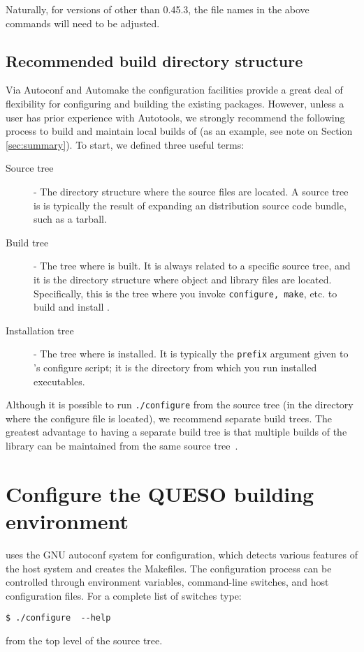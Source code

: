 Naturally, for versions of \Queso{} other than 0.45.3, the file names in the above commands will need to be adjusted.


\subsection{Recommended build directory structure}\label{sec:Queso_tree}

Via Autoconf and Automake the \Queso{} configuration facilities provide a great deal 
of flexibility for configuring and building the existing \Queso{} packages. However,
unless a user has prior experience with Autotools, we strongly recommend
the following process to build and maintain local builds of \Queso{} (as an example, see note on Section \ref{sec:summary}).
To start, we defined three useful terms:

\begin{description}
 \item [Source tree] - The directory structure where the \Queso{} source files are located. A source
tree is is typically the result of expanding an \Queso{} distribution source code bundle, such as a tarball.%
 \item [Build tree] %
- The tree where \Queso{} is built. It is always related to a specific source tree, and it is the directory structure where object and library files are located. Specifically, this is the tree where you invoke \texttt{configure, make}, etc. to build and install \Queso{}. 
 \item [Installation tree] - The tree where \Queso{} is installed. It is typically the \texttt{prefix} argument given to \Queso{}'s configure script; it is the directory from which you run installed \Queso{} executables.
\end{description}

Although it is possible to run \verb+./configure+ from the source tree (in the directory where the configure file is located), we recommend separate build trees. The greatest advantage to having a separate build tree is that multiple builds of the library
can be maintained from the same source tree~\cite{Trilinos}. 


\section{Configure the QUESO building environment}\label{sec:Queso_configure}
\Queso{} uses the GNU autoconf system for configuration, which detects various features of the host system and creates the Makefiles. 
The configuration process can be controlled through environment variables, command-line switches, and host configuration files.
For a complete list of switches type:
\begin{lstlisting}
$ ./configure  --help  
\end{lstlisting}
%
from the top level of the source tree. 

